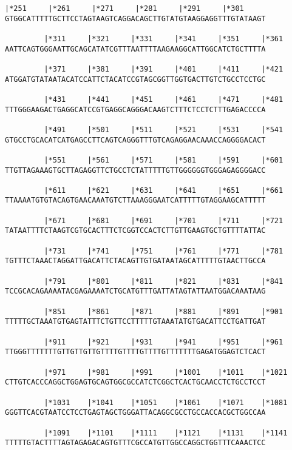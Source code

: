 \documentclass{article}
\begin{document}
\begin{Verbatim}[fontfamily=courier]
         |*251     |*261     |*271     |*281     |*291     |*301
GTGGCATTTTTGCTTCCTAGTAAGTCAGGACAGCTTGTATGTAAGGAGGTTTGTATAAGT

         |*311     |*321     |*331     |*341     |*351     |*361
AATTCAGTGGGAATTGCAGCATATCGTTTAATTTTAAGAAGGCATTGGCATCTGCTTTTA

         |*371     |*381     |*391     |*401     |*411     |*421
ATGGATGTATAATACATCCATTCTACATCCGTAGCGGTTGGTGACTTGTCTGCCTCCTGC

         |*431     |*441     |*451     |*461     |*471     |*481
TTTGGGAAGACTGAGGCATCCGTGAGGCAGGGACAAGTCTTTCTCCTCTTTGAGACCCCA

         |*491     |*501     |*511     |*521     |*531     |*541
GTGCCTGCACATCATGAGCCTTCAGTCAGGGTTTGTCAGAGGAACAAACCAGGGGACACT

         |*551     |*561     |*571     |*581     |*591     |*601
TTGTTAGAAAGTGCTTAGAGGTTCTGCCTCTATTTTTGTTGGGGGGTGGGAGAGGGGACC

         |*611     |*621     |*631     |*641     |*651     |*661
TTAAAATGTGTACAGTGAACAAATGTCTTAAAGGGAATCATTTTTGTAGGAAGCATTTTT

         |*671     |*681     |*691     |*701     |*711     |*721
TATAATTTTCTAAGTCGTGCACTTTCTCGGTCCACTCTTGTTGAAGTGCTGTTTTATTAC

         |*731     |*741     |*751     |*761     |*771     |*781
TGTTTCTAAACTAGGATTGACATTCTACAGTTGTGATAATAGCATTTTTGTAACTTGCCA

         |*791     |*801     |*811     |*821     |*831     |*841
TCCGCACAGAAAATACGAGAAAATCTGCATGTTTGATTATAGTATTAATGGACAAATAAG

         |*851     |*861     |*871     |*881     |*891     |*901
TTTTTGCTAAATGTGAGTATTTCTGTTCCTTTTTGTAAATATGTGACATTCCTGATTGAT

         |*911     |*921     |*931     |*941     |*951     |*961
TTGGGTTTTTTTGTTGTTGTTGTTTTGTTTTGTTTTGTTTTTTTGAGATGGAGTCTCACT

         |*971     |*981     |*991     |*1001    |*1011    |*1021
CTTGTCACCCAGGCTGGAGTGCAGTGGCGCCATCTCGGCTCACTGCAACCTCTGCCTCCT

         |*1031    |*1041    |*1051    |*1061    |*1071    |*1081
GGGTTCACGTAATCCTCCTGAGTAGCTGGGATTACAGGCGCCTGCCACCACGCTGGCCAA

         |*1091    |*1101    |*1111    |*1121    |*1131    |*1141
TTTTTGTACTTTTAGTAGAGACAGTGTTTCGCCATGTTGGCCAGGCTGGTTTCAAACTCC

\end{Verbatim}
\end{document}
